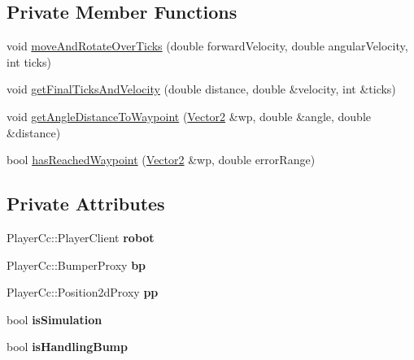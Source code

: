 \subsection*{Private Member Functions}
\begin{DoxyCompactItemize}
\item 
void \hyperlink{classRobot_aa4b3f22bf6f084baaa9a2e2a8b0e491d}{move\+And\+Rotate\+Over\+Ticks} (double forward\+Velocity, double angular\+Velocity, int ticks)
\item 
void \hyperlink{classRobot_a2ff342657f459c4ab2434706d5e9a2d6}{get\+Final\+Ticks\+And\+Velocity} (double distance, double \&velocity, int \&ticks)
\item 
void \hyperlink{classRobot_ad5ffe11725c6c7ba80fa724ada8771fe}{get\+Angle\+Distance\+To\+Waypoint} (\hyperlink{structVector2}{Vector2} \&wp, double \&angle, double \&distance)
\item 
bool \hyperlink{classRobot_a0de5b178abb5ebcc4f936fb1cf7ca9dc}{has\+Reached\+Waypoint} (\hyperlink{structVector2}{Vector2} \&wp, double error\+Range)
\end{DoxyCompactItemize}
\subsection*{Private Attributes}
\begin{DoxyCompactItemize}
\item 
\mbox{\label{classRobot_ac3903c0fa2e632a3fc62b359ed1f12f2}} 
Player\+Cc\+::\+Player\+Client {\bfseries robot}
\item 
\mbox{\label{classRobot_a32ed999d2284b95c3596c6f073419332}} 
Player\+Cc\+::\+Bumper\+Proxy {\bfseries bp}
\item 
\mbox{\label{classRobot_a1a1e0da135cca4e2b18b6f7d6fa23c37}} 
Player\+Cc\+::\+Position2d\+Proxy {\bfseries pp}
\item 
\mbox{\label{classRobot_ab88f32a555401802c4022603cc59b056}} 
bool {\bfseries is\+Simulation}
\item 
\mbox{\label{classRobot_a9c01fc0ef1c08e887f9665b108a890c8}} 
bool {\bfseries is\+Handling\+Bump}
\end{DoxyCompactItemize}

